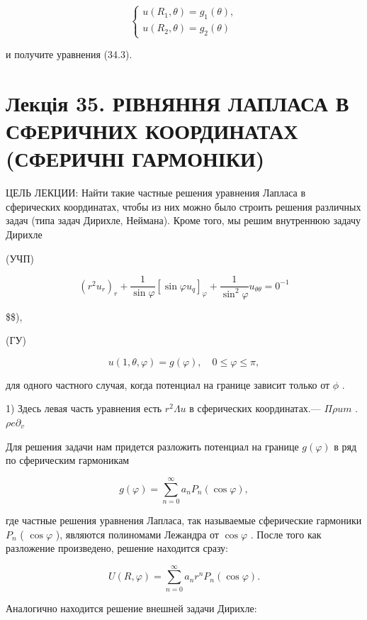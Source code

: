 \documentclass[
  ukrainian,
]{article}
\begin{document}
\[
\begin{cases} u(R_1, \theta) = g_1(\theta), \\ u(R_2, \theta) = g_2(\theta) \end{cases}
\]

и получите уравнения (34.3).

\section{Лекція 35. РІВНЯННЯ ЛАПЛАСА В СФЕРИЧНИХ КООРДИНАТАХ (СФЕРИЧНІ
ГАРМОНІКИ)}\label{ux43bux435ux43aux446ux456ux44f-35.-ux440ux456ux432ux43dux44fux43dux43dux44f-ux43bux430ux43fux43bux430ux441ux430-ux432-ux441ux444ux435ux440ux438ux447ux43dux438ux445-ux43aux43eux43eux440ux434ux438ux43dux430ux442ux430ux445-ux441ux444ux435ux440ux438ux447ux43dux456-ux433ux430ux440ux43cux43eux43dux456ux43aux438}

ЦЕЛЬ ЛЕКЦИИ: Найти такие частные решения уравнения Лапласа в сферических
координатах, чтобы из них можно было строить решения различных задач
(типа задач Дирихле, Неймана). Кроме того, мы решим внутреннюю задачу
Дирихле

(УЧП)

\[
(r^2u_r)_r + \frac{1}{\sin\varphi} \left[\sin\varphi u_q\right]_{\varphi} + \frac{1}{\sin^2\varphi} u_{\theta\theta} = 0^{-1}
\]

\$\$),

(ГУ)

\[
u(1, \theta, \varphi) = g(\varphi), \quad 0 \le \varphi \le \pi,
\]

для одного частного случая, когда потенциал на границе зависит только от
\(\phi\) .

1) Здесь левая часть уравнения есть \(r^2 \Lambda u\) в сферических
координатах.--- \(\Pi \rho u m\) . \(\rho e \partial_v\)

Для решения задачи нам придется разложить потенциал на границе
\(g(\varphi)\) в ряд по сферическим гармоникам

\[
g(\varphi) = \sum_{n=0}^{\infty} a_n P_n(\cos \varphi),
\]

где частные решения уравнения Лапласа, так называемые сферические
гармоники \(P_n\) ( \(\cos \varphi\) ), являются полиномами Лежандра от
\(\cos \varphi\) . После того как разложение произведено, решение
находится сразу:

\[
U(R, \varphi) = \sum_{n=0}^{\infty} a_n r^n P_n(\cos \varphi).
\]

Аналогично находится решение внешней задачи Дирихле:
\end{document}
